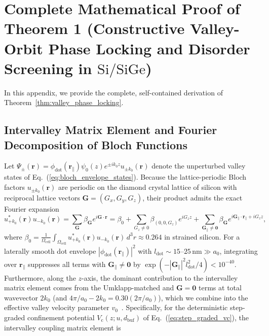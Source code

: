 \documentclass[11pt,letterpaper]{article}
\theoremstyle{definition}
\begin{document}
\section{Complete Mathematical Proof of Theorem 1 (Constructive Valley-Orbit Phase Locking and Disorder Screening in $\mathrm{Si/SiGe}$)}
\label{app:proof_thm1}

In this appendix, we provide the complete, self-contained derivation of Theorem~\ref{thm:valley_phase_locking}.

\subsection{Intervalley Matrix Element and Fourier Decomposition of Bloch Functions}

Let $\Psi_{\pm}(\mathbf{r}) = \phi_{\mathrm{dot}}(\mathbf{r}_\parallel)\psi_0(z)e^{\pm i k_0 z} u_{\pm k_0}(\mathbf{r})$ denote the unperturbed valley states of Eq.~(\ref{eq:bloch_envelope_states}). Because the lattice-periodic Bloch factors $u_{\pm k_0}(\mathbf{r})$ are periodic on the diamond crystal lattice of silicon with reciprocal lattice vectors $\mathbf{G} = (G_x, G_y, G_z)$, their product admits the exact Fourier expansion~\cite{Saraiva2009}
\begin{equation}
  u_{+k_0}^*(\mathbf{r}) u_{-k_0}(\mathbf{r}) = \sum_{\mathbf{G}} \beta_{\mathbf{G}} e^{i \mathbf{G}\cdot\mathbf{r}} = \beta_0 + \sum_{G_z \neq 0} \beta_{(0,0,G_z)} e^{i G_z z} + \sum_{\mathbf{G}_\parallel \neq \mathbf{0}} \beta_{\mathbf{G}} e^{i\mathbf{G}_\parallel\cdot\mathbf{r}_\parallel + i G_z z},
  \label{eq:appA_bloch_product}
\end{equation}
where $\beta_0 = \frac{1}{\Omega_{\mathrm{cell}}}\int_{\Omega_{\mathrm{cell}}} u_{+k_0}^*(\mathbf{r}) u_{-k_0}(\mathbf{r})\,d^3r \approx 0.264$ in strained silicon. For a laterally smooth dot envelope $|\phi_{\mathrm{dot}}(\mathbf{r}_\parallel)|^2$ with $l_{\mathrm{dot}} \sim 15$--$25\,\mathrm{nm} \gg a_0$, integrating over $\mathbf{r}_\parallel$ suppresses all terms with $\mathbf{G}_\parallel \neq \mathbf{0}$ by $\exp(-|\mathbf{G}_\parallel|^2 l_{\mathrm{dot}}^2 / 4) < 10^{-40}$. Furthermore, along the $z$-axis, the dominant contribution to the intervalley matrix element comes from the Umklapp-matched and $\mathbf{G}=\mathbf{0}$ terms at total wavevector $2k_0$ (and $4\pi/a_0 - 2k_0 = 0.30(2\pi/a_0)$), which we combine into the effective valley velocity parameter $v_0$~\cite{Friesen2007, Saraiva2009}. Specifically, for the deterministic step-graded confinement potential $V_{\mathrm{c}}(z; u, d_{\mathrm{buf}})$ of Eq.~(\ref{eq:step_graded_vc}), the intervalley coupling matrix element is
\end{document}
